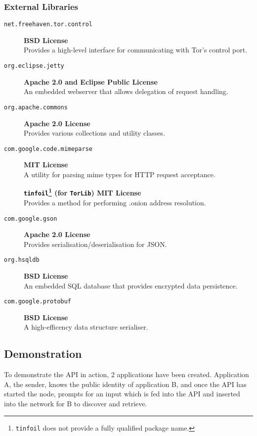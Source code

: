 		\subsubsection*{External Libraries}
			\begin{description}
				\item[\texttt{net.freehaven.tor.control}]\textbf{\hfill BSD License} \\
					Provides a high-level interface for communicating with Tor's control port.
				\item[\texttt{org.eclipse.jetty}]\textbf{\hfill Apache 2.0 and Eclipse Public License} \\
					An embedded webserver that allows delegation of request handling.
				\item[\texttt{org.apache.commons}]\textbf{\hfill Apache 2.0 License} \\
					Provides various collections and utility classes.
				\item[\texttt{com.google.code.mimeparse}]\textbf{\hfill MIT License} \\
					A utility for parsing mime types for HTTP request acceptance.
				\item[]\hspace*{-1ex}\textbf{\texttt{tinfoil}\footnote{\texttt{tinfoil} does not provide a fully qualified package name.} (for \texttt{TorLib}) \hfill MIT License}\\
					Provides a method for performing .onion address resolution.
				\item[\texttt{com.google.gson}]\textbf{\hfill Apache 2.0 License}\\
					Provides serialisation/deserialisation for JSON.
				\item[\texttt{org.hsqldb}]\textbf{\hfill BSD License}\\
					An embedded SQL database that provides encrypted data persistence.
				\item[\texttt{com.google.protobuf}]\textbf{\hfill BSD License}\\
					A high-efficency data structure serialiser.
			\end{description}
	\subsection{Demonstration}
		To demonstrate the API in action, 2 applications have been created. Application A, the sender, knows the public identity of application B, and once the API has started the node, prompts for an input which is fed into the API and inserted into the network for B to discover and retrieve.
